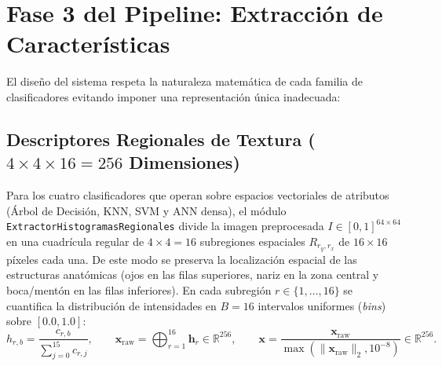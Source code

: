 \documentclass{article}
\begin{document}
\section{Fase 3 del Pipeline: Extracción de Características}

El diseño del sistema respeta la naturaleza matemática de cada familia de clasificadores evitando imponer una representación única inadecuada:

\subsection{Descriptores Regionales de Textura (\texorpdfstring{$4 \times 4 \times 16 = 256$}{4 x 4 x 16 = 256} Dimensiones)}
Para los cuatro clasificadores que operan sobre espacios vectoriales de atributos (Árbol de Decisión, KNN, SVM y ANN densa), el módulo \texttt{ExtractorHistogramasRegionales} divide la imagen preprocesada $I \in [0,1]^{64 \times 64}$ en una cuadrícula regular de $4 \times 4 = 16$ subregiones espaciales $R_{r_y, r_x}$ de $16 \times 16$ píxeles cada una. De este modo se preserva la localización espacial de las estructuras anatómicas (ojos en las filas superiores, nariz en la zona central y boca/mentón en las filas inferiores). En cada subregión $r \in \{1,\dots,16\}$ se cuantifica la distribución de intensidades en $B = 16$ intervalos uniformes (\textit{bins}) sobre $[0.0, 1.0]$:
\begin{equation}
h_{r,b} = \frac{c_{r,b}}{\sum_{j=0}^{15} c_{r,j}}, \qquad \mathbf{x}_{\text{raw}} = \bigoplus_{r=1}^{16} \mathbf{h}_r \in \mathbb{R}^{256}, \qquad \mathbf{x} = \frac{\mathbf{x}_{\text{raw}}}{\max(\|\mathbf{x}_{\text{raw}}\|_2, 10^{-8})} \in \mathbb{R}^{256}.
\label{eq:vector_histogramas}
\end{equation}
\end{document}
